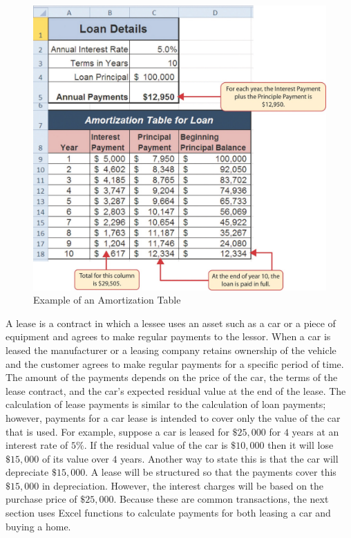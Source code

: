 \begin{figure}[H]
	\centering
	\includegraphics[width=\maxwidth{.95\linewidth}]{gfx/ch02_fig29}
	\caption{Example of an Amortization Table}
	\label{02:fig29}
\end{figure}

A lease is a contract in which a lessee uses an asset such as a car or a piece of equipment and agrees to make regular payments to the lessor. When a car is leased the manufacturer or a leasing company retains ownership of the vehicle and the customer agrees to make regular payments for a specific period of time. The amount of the payments depends on the price of the car, the terms of the lease contract, and the car's expected residual value at the end of the lease. The calculation of lease payments is similar to the calculation of loan payments; however, payments for a car lease is intended to cover only the value of the car that is used. For example, suppose a car is leased for $ \$25,000 $ for $ 4 $ years at an interest rate of $ 5\% $. If the residual value of the car is $ \$10,000 $ then it will lose $ \$15,000 $ of its value over $ 4 $ years. Another way to state this is that the car will depreciate $ \$15,000 $. A lease will be structured so that the payments cover this $ \$15,000 $ in depreciation. However, the interest charges will be based on the purchase price of $ \$25,000 $. Because these are common transactions, the next section uses Excel functions to calculate payments for both leasing a car and buying a home.

